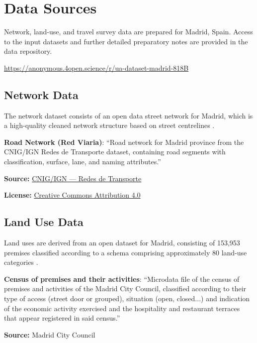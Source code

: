 \section{Data Sources}\label{data-methods}

Network, land-use, and travel survey data are prepared for Madrid, Spain. Access to the input datasets and further detailed preparatory notes are provided in the data repository.

\url{https://anonymous.4open.science/r/ua-dataset-madrid-818B}

\subsection{Network Data}

The network dataset consists of an open data street network for Madrid, which is a high-quality cleaned network structure based on street centrelines \cite{madrid_street_network}.

\textbf{Road Network (Red Viaria)}: ``Road network for Madrid province from the CNIG/IGN Redes de Transporte dataset, containing road segments with classification, surface, lane, and naming attributes.''

\textbf{Source:} \href{https://centrodedescargas.cnig.es/CentroDescargas/index.jsp}{CNIG/IGN --- Redes de Transporte}

\textbf{License:} \href{https://creativecommons.org/licenses/by/4.0/legalcode.es}{Creative Commons Attribution 4.0}

\subsection{Land Use Data}

Land uses are derived from an open dataset for Madrid, consisting of 153,953 premises classified according to a schema comprising approximately 80 land-use categories \cite{madrid_premises}.

\textbf{Census of premises and their activities}: ``Microdata file of the census of premises and activities of the Madrid City Council, classified according to their type of access (street door or grouped), situation (open, closed...) and indication of the economic activity exercised and the hospitality and restaurant terraces that appear registered in said census.''

\textbf{Source:} Madrid City Council

